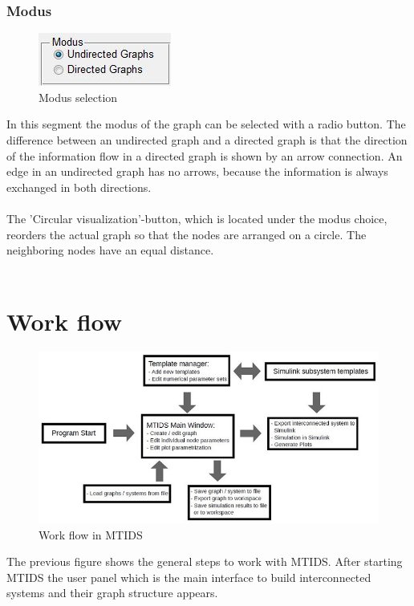 \documentclass[12pt]{report}
\begin{document}
\subsubsection{Modus}
\begin{figure}[h]
\centering
\includegraphics[scale=1.0]{modus}
\caption{Modus selection}
\label{FIG:abb35}
\end{figure}
In this segment the modus of the graph can be selected with a radio button. The difference between an undirected graph and a directed graph is that the direction of the information flow in a directed graph is shown by an arrow connection. An edge in an undirected graph has no arrows, because the information is always exchanged in both directions.\\
\\
The 'Circular visualization'-button, which is located under the modus choice, reorders the actual graph so that the nodes are arranged on a circle. The neighboring nodes have an equal distance.\\
\\
\section{Work flow}
\label{sec:workflow}
\begin{figure}[h]
\centering
\includegraphics[scale=.5]{workflowmtids}
\caption{Work flow in MTIDS}
\label{FIG:abb37}
\end{figure}
The previous figure shows the general steps to work with MTIDS. After starting MTIDS the user panel which is the main interface to build interconnected systems and their graph structure appears.\\
\\
\end{document}
